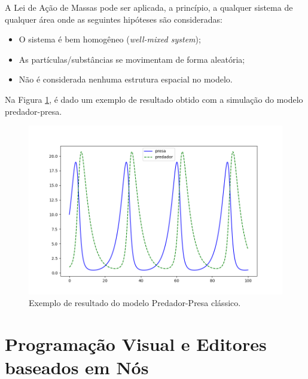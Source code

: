 \documentclass[
	12pt,				%
	openright,			%
	oneside,			%
	a4paper,			%
	main=brazil,
	english,			%
	]{ufsj-abntex2}
\begin{document}
A Lei de Ação de Massas pode ser aplicada, a princípio, a qualquer sistema de qualquer área onde as seguintes hipóteses são consideradas: 
    \begin{itemize}
        \item O sistema é bem homogêneo (\textit{well-mixed system}); 
        \item As partículas/substâncias se movimentam de forma aleatória; 
        \item Não é considerada nenhuma estrutura espacial no modelo.
    \end{itemize}

Na Figura \ref{fig:hostprey}, é dado um exemplo de resultado obtido com a simulação do modelo predador-presa. 

\begin{figure}[h]
    \centering
    \includegraphics[scale=0.6]{imgs/hostprey.png} 
    \caption{Exemplo de resultado do modelo Predador-Presa clássico.}
    \label{fig:hostprey}
\end{figure}




\section{Programação Visual e Editores baseados em Nós}
\label{sec:programacao-visual}
\end{document}
